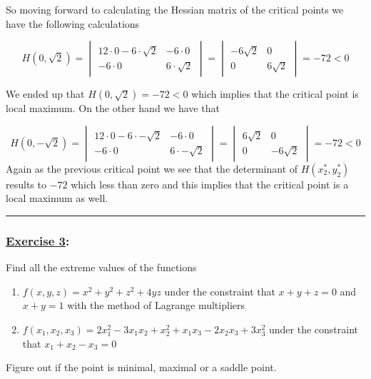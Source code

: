 \documentclass[
]{article}
\providecommand{\tightlist}{%
  \setlength{\itemsep}{0pt}\setlength{\parskip}{0pt}}
\begin{document}
So moving forward to calculating the Hessian matrix of the critical
points we have the following calculations

\[
H(0,\sqrt2) = \begin{vmatrix}
12\cdot0-6\cdot\sqrt2 & -6\cdot0 \\
-6\cdot0 & 6\cdot\sqrt2
\end{vmatrix}=\begin{vmatrix}
-6\sqrt2 & 0\\
0 & 6\sqrt2
\end{vmatrix}= -72 <0
\]

We ended up that \(H(0,\sqrt2)=-72<0\) which implies that the critical
point is local maximum. On the other hand we have that

\[
H(0,-\sqrt2) = \begin{vmatrix}
12\cdot0-6\cdot-\sqrt2 & -6\cdot0 \\
-6\cdot0 & 6\cdot-\sqrt2
\end{vmatrix}=\begin{vmatrix}
6\sqrt2 & 0\\
0 & -6\sqrt2
\end{vmatrix}= -72 <0
\] Again as the previous critical point we see that the determinant of
\(H(x_2^*,y_2^*)\) results to \(-72\) which less than zero and this
implies that the critical point is a local maximum as well.

\begin{center}\rule{0.5\linewidth}{0.5pt}\end{center}

\hypertarget{section-4}{%
\subsubsection{\texorpdfstring{\underline{Exercise 3}:}{:}}\label{section-4}}

Find all the extreme values of the functions

\begin{enumerate}
\def\labelenumi{\alph{enumi}.}
\tightlist
\item
  \(f(x,y,z)=x^2+y^2+z^2+4yz\) under the constraint that \(x+y+z=0\) and
  \(x+y=1\) with the method of Lagrange multipliers\\
\item
  \(f(x_1,x_2,x_3)=2x_1^2-3x_1x_2+x_2^2+x_1x_3-2x_2x_3+3x_3^2\) under
  the constraint that \(x_1+x_2-x_3 = 0\)
\end{enumerate}

Figure out if the point is minimal, maximal or a saddle point.
\end{document}
